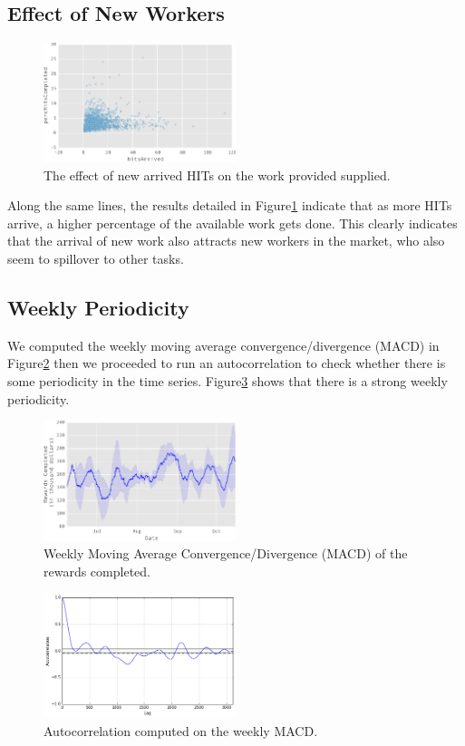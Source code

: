 \subsection{Effect of New Workers}
\begin{figure}[htbp]
	\centering
		\includegraphics[width=0.5\textwidth]{figures/percHitsCompleted}
	\caption{The effect of new arrived HITs on the work provided supplied.}
	\label{fig:perc_hits_completed}
\end{figure}
Along the same lines, the results detailed in Figure\ref{fig:perc_hits_completed} indicate that as more HITs arrive, a higher percentage of the available work gets done. 
This clearly indicates that the arrival of new work also attracts new workers
in the market, who also seem to spillover to other tasks.

\subsection{Weekly Periodicity}
We computed the weekly moving average convergence/divergence (MACD) in Figure\ref{fig:mac} then we proceeded to run an autocorrelation to check whether there is some periodicity in the time series. Figure\ref{fig:autocorrelation2} shows that there is a strong weekly periodicity.
\begin{figure}[htbp]
	\centering
		\includegraphics[width=0.5\textwidth]{figures/mac}
	\caption{Weekly Moving Average Convergence/Divergence (MACD) of the rewards completed.}
	\label{fig:mac}
\end{figure}
\begin{figure}[htbp]
	\centering
		\includegraphics[width=0.5\textwidth]{figures/autocorrelation2}
	\caption{Autocorrelation computed on the weekly MACD.}
	\label{fig:autocorrelation2}
\end{figure}